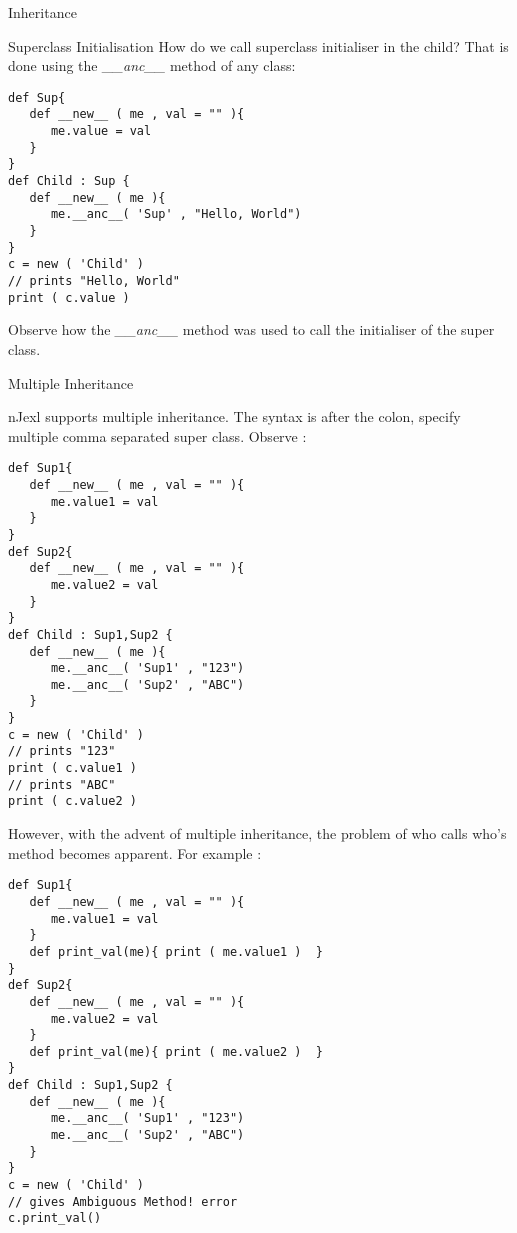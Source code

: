 \begin{section}{Inheritance}
\begin{subsection}{Superclass Initialisation}
How do we call superclass initialiser in the child?
That is done using the \emph{\_\_anc\_\_} method 
of any class:

\begin{center}\begin{minipage}{\linewidth}
\begin{lstlisting}[style=JexlStyle]
def Sup{
   def __new__ ( me , val = "" ){
      me.value = val 
   }
}
def Child : Sup {
   def __new__ ( me ){
      me.__anc__( 'Sup' , "Hello, World")
   }
}
c = new ( 'Child' )
// prints "Hello, World"
print ( c.value )
\end{lstlisting}  
\end{minipage}\end{center}

Observe how the \emph{\_\_anc\_\_} method 
was used to call the initialiser of the super class.
\end{subsection}


\begin{subsection}{Multiple Inheritance}

nJexl supports multiple inheritance. The syntax is
after the colon, specify multiple comma separated super class.
Observe :

\begin{center}\begin{minipage}{\linewidth}
\begin{lstlisting}[style=JexlStyle]
def Sup1{
   def __new__ ( me , val = "" ){
      me.value1 = val
   }
}
def Sup2{
   def __new__ ( me , val = "" ){
      me.value2 = val 
   }
}
def Child : Sup1,Sup2 {
   def __new__ ( me ){
      me.__anc__( 'Sup1' , "123")
      me.__anc__( 'Sup2' , "ABC")
   }
}
c = new ( 'Child' )
// prints "123"
print ( c.value1 )
// prints "ABC"
print ( c.value2 )
\end{lstlisting}  
\end{minipage}\end{center}

However, with the advent of multiple inheritance,
the problem of who calls who's method becomes apparent.
For example :

\begin{center}\begin{minipage}{\linewidth}
\begin{lstlisting}[style=JexlStyle]
def Sup1{
   def __new__ ( me , val = "" ){
      me.value1 = val
   }
   def print_val(me){ print ( me.value1 )  }
}
def Sup2{
   def __new__ ( me , val = "" ){
      me.value2 = val 
   }
   def print_val(me){ print ( me.value2 )  }
}
def Child : Sup1,Sup2 {
   def __new__ ( me ){
      me.__anc__( 'Sup1' , "123")
      me.__anc__( 'Sup2' , "ABC")
   }  
}
c = new ( 'Child' )
// gives Ambiguous Method! error
c.print_val()
\end{lstlisting}  
\end{minipage}\end{center}


\end{subsection}
\end{section}
